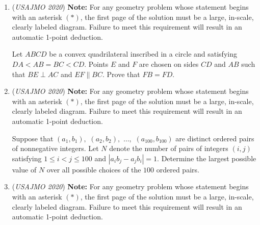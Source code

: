 \begin{enumerate}
 
            \begin{itemize}
        \item The two $1 \times 1$ faces of each beam coincide with unit cells lying on opposite faces of the cube. (Hence, there are $3 \cdot {2020}^2$ possible positions for a beam.)

        \item No two beams have intersecting interiors.

        \item The interiors of each of the four $1 \times 2020$ faces of each beam touch either a face of the cube or the interior of the face of another beam.
            \end{itemize}
            What is the smallest positive number of beams that can be placed to satisfy these conditions?


 

	\item (\textit{USAJMO 2020}) \textbf{Note:} For any geometry problem whose statement begins with an asterisk $(*)$, the first page of the solution must be a large, in-scale, clearly labeled diagram. Failure to meet this requirement will result in an automatic 1-point deduction.


 Let $ABCD$ be a convex quadrilateral inscribed in a circle and satisfying $DA < AB = BC < CD$. Points $E$ and $F$ are chosen on sides $CD$ and $AB$ such that $BE \perp AC$ and $EF \parallel BC$. Prove that $FB = FD$.


 

	\item (\textit{USAJMO 2020}) \textbf{Note:} For any geometry problem whose statement begins with an asterisk $(*)$, the first page of the solution must be a large, in-scale, clearly labeled diagram. Failure to meet this requirement will result in an automatic 1-point deduction.


 Suppose that $(a_1,b_1),$ $(a_2,b_2),$ $\dots,$ $(a_{100},b_{100})$ are distinct ordered pairs of nonnegative integers. Let $N$ denote the number of pairs of integers $(i,j)$ satisfying $1\leq i<j\leq 100$ and $|a_ib_j-a_jb_i|=1$. Determine the largest possible value of $N$ over all possible choices of the $100$ ordered pairs.


 

	\item (\textit{USAJMO 2020}) \textbf{Note:} For any geometry problem whose statement begins with an asterisk $(*)$, the first page of the solution must be a large, in-scale, clearly labeled diagram. Failure to meet this requirement will result in an automatic 1-point deduction.



\end{enumerate}
